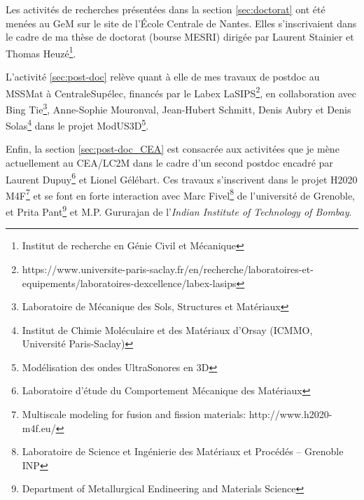 Les activités de recherches présentées dans la section \ref{sec:doctorat} ont été menées au GeM sur le site de l'{\'E}cole Centrale de Nantes.
Elles s'inscrivaient dans le cadre de ma thèse de doctorat (bourse MESRI) dirigée par Laurent Stainier et Thomas Heuzé\footnote{\label{GeM}Institut de recherche en Génie Civil et Mécanique}.

L'activité \ref{sec:post-doc} relève quant à elle de mes travaux de postdoc au MSSMat à CentraleSupélec, financés par le Labex LaSIPS\footnote{https://www.universite-paris-saclay.fr/en/recherche/laboratoires-et-equipements/laboratoires-dexcellence/labex-lasips}, en collaboration avec Bing Tie\footnote{\label{MSSMat}Laboratoire de Mécanique des Sols, Structures et Matériaux}, Anne-Sophie Mouronval, Jean-Hubert Schmitt, Denis Aubry et Denis Solas\footnote{Institut de Chimie Moléculaire et des Matériaux d'Orsay (ICMMO, Université Paris-Saclay)}  dans le projet ModUS3D\footnote{Modélisation des ondes UltraSonores en 3D}.

Enfin, la section \ref{sec:post-doc_CEA} est consacrée aux activitées que je mène actuellement au CEA/LC2M dans le cadre d'un second postdoc encadré par Laurent Dupuy\footnote{\label{LC2M}Laboratoire d'étude du Comportement Mécanique des Matériaux} et Lionel Gélébart.
Ces travaux s'inscrivent dans le projet H2020 M4F\footnote{Multiscale modeling for fusion and fission materials: http://www.h2020-m4f.eu/} et se font en forte interaction avec Marc Fivel\footnote{\label{SIMap}Laboratoire de Science et Ingénierie des Matériaux et Procédés -- Grenoble INP} de l'université de Grenoble, et  Prita Pant\footnote{\label{ITT}Department of Metallurgical Endineering and Materials Science} et M.P. Gururajan de l'\textit{Indian Institute of Technology of Bombay}.


%   


